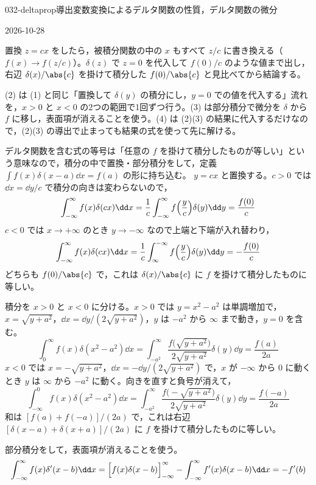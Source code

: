 \documentclass[uplatex,dvipdfmx,a4paper,11pt]{jsarticle}
\begin{document}
\begin{mondai}{032-deltaprop}{導出}{変数変換によるデルタ関数の性質，デルタ関数の微分}
\begin{kotaeutsushi}{2026-10-28}
\mikai
{}
\mikai
\end{kotaeutsushi}
\begin{kizuki}
\item 置換 $z=cx$ をしたら，被積分関数の中の $x$ もすべて $z/c$ に書き換える（$f(x)\to f(z/c)$）。$\delta(z)$ で $z=0$ を代入して $f(0)/c$ のような値まで出し，右辺 $\delta(x)/\abs{c}$ を掛けて積分した $f(0)/\abs{c}$ と見比べてから結論する。
\item (2) は (1) と同じ「置換して $\delta(y)$ の積分にし，$y=0$ での値を代入する」流れを，$x>0$ と $x<0$ の2つの範囲で1回ずつ行う。(3) は部分積分で微分を $\delta$ から $f$ に移し，表面項が消えることを使う。(4) は (2)(3) の結果に代入するだけなので，(2)(3) の導出で止まっても結果の式を使って先に解ける。
\end{kizuki}
\begin{tadashii}
\houshin デルタ関数を含む式の等号は「任意の $f$ を掛けて積分したものが等しい」という意味なので，積分の中で置換・部分積分をして，定義 $\int f(x)\delta(x-a)\dd x=f(a)$ の形に持ち込む。
\keisan {} $y=cx$ と置換する。$c>0$ では $\dd x=\dd y/c$ で積分の向きは変わらないので，
\[ \int_{-\infty}^{\infty}f(x)\delta(cx)\dd x=\frac{1}{c}\int_{-\infty}^{\infty}f\Bigl(\frac{y}{c}\Bigr)\delta(y)\dd y=\frac{f(0)}{c} \]
$c<0$ では $x\to+\infty$ のとき $y\to-\infty$ なので上端と下端が入れ替わり，
\[ \int_{-\infty}^{\infty}f(x)\delta(cx)\dd x=\frac{1}{c}\int_{\infty}^{-\infty}f\Bigl(\frac{y}{c}\Bigr)\delta(y)\dd y=-\frac{f(0)}{c} \]
どちらも $f(0)/\abs{c}$ で，これは $\delta(x)/\abs{c}$ に $f$ を掛けて積分したものに等しい。

 積分を $x>0$ と $x<0$ に分ける。$x>0$ では $y=x^{2}-a^{2}$ は単調増加で，$x=\sqrt{y+a^{2}}$，$\dd x=\dd y/(2\sqrt{y+a^{2}})$，$y$ は $-a^{2}$ から $\infty$ まで動き，$y=0$ を含む。
\[ \int_{0}^{\infty}f(x)\delta(x^{2}-a^{2})\dd x=\int_{-a^{2}}^{\infty}\frac{f\bigl(\sqrt{y+a^{2}}\bigr)}{2\sqrt{y+a^{2}}}\delta(y)\dd y=\frac{f(a)}{2a} \]
$x<0$ では $x=-\sqrt{y+a^{2}}$，$\dd x=-\dd y/(2\sqrt{y+a^{2}})$ で，$x$ が $-\infty$ から $0$ に動くとき $y$ は $\infty$ から $-a^{2}$ に動く。向きを直すと負号が消えて，
\[ \int_{-\infty}^{0}f(x)\delta(x^{2}-a^{2})\dd x=\int_{-a^{2}}^{\infty}\frac{f\bigl(-\sqrt{y+a^{2}}\bigr)}{2\sqrt{y+a^{2}}}\delta(y)\dd y=\frac{f(-a)}{2a} \]
和は $[f(a)+f(-a)]/(2a)$ で，これは右辺 $[\delta(x-a)+\delta(x+a)]/(2a)$ に $f$ を掛けて積分したものに等しい。

 部分積分をして，表面項が消えることを使う。
\[ \int_{-\infty}^{\infty}f(x)\delta'(x-b)\dd x=\Bigl[f(x)\delta(x-b)\Bigr]_{-\infty}^{\infty}-\int_{-\infty}^{\infty}f'(x)\delta(x-b)\dd x=-f'(b) \]


\end{tadashii}
\end{mondai}
\end{document}
